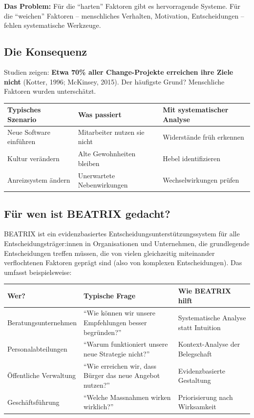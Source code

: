 \documentclass[11pt,a4paper]{article}
\begin{document}
\textbf{Das Problem:} Für die ``harten'' Faktoren gibt es hervorragende Systeme. Für die ``weichen'' Faktoren -- menschliches Verhalten, Motivation, Entscheidungen -- fehlen systematische Werkzeuge.

\subsection{Die Konsequenz}

Studien zeigen: \textbf{Etwa 70\% aller Change-Projekte erreichen ihre Ziele nicht} (Kotter, 1996; McKinsey, 2015). Der häufigste Grund? Menschliche Faktoren wurden unterschätzt.

\begin{table}[h]
\centering
\begin{tabular}{@{}L{4cm}L{4cm}L{5cm}@{}}
\toprule
\textbf{Typisches Szenario} & \textbf{Was passiert} & \textbf{Mit systematischer Analyse} \\
\midrule
Neue Software einführen & Mitarbeiter nutzen sie nicht & Widerstände früh erkennen \\
Kultur verändern & Alte Gewohnheiten bleiben & Hebel identifizieren \\
Anreizsystem ändern & Unerwartete Nebenwirkungen & Wechselwirkungen prüfen \\
\bottomrule
\end{tabular}
\end{table}

\subsection{Für wen ist BEATRIX gedacht?}

BEATRIX ist ein evidenzbasiertes Entscheidungsunterstützungssystem für alle Entscheidungsträger:innen in Organisationen und Unternehmen, die grundlegende Entscheidungen treffen müssen, die von vielen gleichzeitig miteinander verflochtenen Faktoren geprägt sind (also von komplexen Entscheidungen). Das umfasst beispielsweise:

\begin{table}[h]
\centering
\begin{tabular}{@{}L{3.5cm}L{4.5cm}L{5cm}@{}}
\toprule
\textbf{Wer?} & \textbf{Typische Frage} & \textbf{Wie BEATRIX hilft} \\
\midrule
Beratungsunternehmen & ``Wie können wir unsere Empfehlungen besser begründen?'' & Systematische Analyse statt Intuition \\
Personalabteilungen & ``Warum funktioniert unsere neue Strategie nicht?'' & Kontext-Analyse der Belegschaft \\
Öffentliche Verwaltung & ``Wie erreichen wir, dass Bürger das neue Angebot nutzen?'' & Evidenzbasierte Gestaltung \\
Geschäftsführung & ``Welche Massnahmen wirken wirklich?'' & Priorisierung nach Wirksamkeit \\
\bottomrule
\end{tabular}
\end{table}
\end{document}
